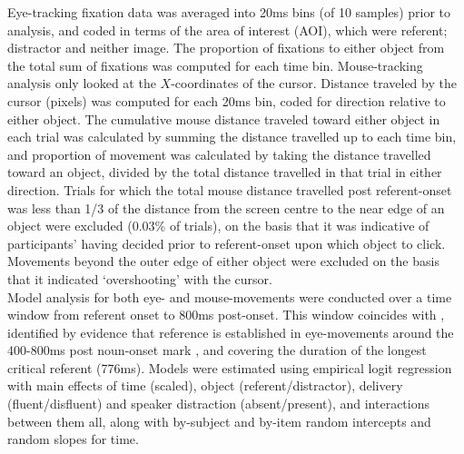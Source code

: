 \documentclass[a4paper,man,natbib]{apa6}
\begin{document}
Eye-tracking fixation data was averaged into 20ms bins (of 10 samples) prior to analysis, and coded in terms of the area of interest (AOI), which were referent; distractor and neither image. 
The proportion of fixations to either object from the total sum of fixations was computed for each time bin. 
Mouse-tracking analysis only looked at the $X$-coordinates of the cursor.
Distance traveled by the cursor (pixels) was computed for each 20ms bin, coded for direction relative to either object. 
The cumulative mouse distance traveled toward either object in each trial was calculated by summing the distance travelled up to each time bin, and proportion of movement was calculated by taking the distance travelled toward an object, divided by the total distance travelled in that trial in either direction. 
Trials for which the total mouse distance travelled post referent-onset was less than 1/3 of the distance from the screen centre to the near edge of an object were excluded (0.03\% of trials), on the basis that it was indicative of participants' having decided prior to referent-onset upon which object to click. 
Movements beyond the outer edge of either object were excluded on the basis that it indicated `overshooting' with the cursor.\\

Model analysis for both eye- and mouse-movements were conducted over a time window from referent onset to 800ms post-onset. 
This window coincides with \citet{Loy2016}, identified by evidence that reference is established in eye-movements around the 400-800ms post noun-onset mark \citep{Eberhard1995}, and covering the duration of the longest critical referent (776ms). 
Models were estimated using empirical logit regression \citep{Barr2008} with main effects of time (scaled), object (referent/distractor), delivery (fluent/disfluent) and speaker distraction (absent/present), and interactions between them all, along with by-subject and by-item random intercepts and random slopes for time. \\
\end{document}
